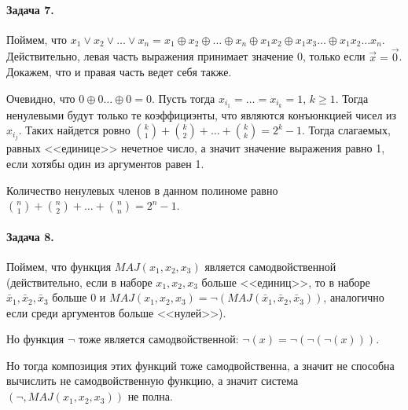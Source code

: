 \documentclass{article}
\newcommand{\xor}{\oplus}
\begin{document}
     \paragraph{Задача 7.}
     Поймем, что $x_1 \vee x_2 \vee \ldots \vee x_n = x_1 \xor x_2 \xor \ldots \xor x_n \xor x_1x_2 \xor x_1x_3 \ldots \xor x_1x_2\ldots x_n$. Действительно, левая часть выражения принимает значение 0, только если $\vec{x} = \vec{0}$.
     Докажем, что и правая часть ведет себя также.

     Очевидно, что $0 \xor 0 \ldots \xor 0 = 0$. Пусть тогда $x_{i_1}=  \ldots = x_{i_k} = 1$, $k \ge 1$. Тогда ненулевыми будут только те коэффициэнты, что являются конъюнкцией чисел из ${x_{i_j}}$. Таких найдется ровно ${k \choose 1} + {k \choose 2} + \ldots + {k \choose k} = 2^k - 1$. Тогда слагаемых, равных <<единице>> нечетное число, а значит значение выражения равно 1, если хотябы один из аргументов равен 1.

     Количество ненулевых членов в данном полиноме равно ${n \choose 1} + {n \choose 2} + \ldots + {n \choose n} = 2^n - 1$.
     
     \paragraph{Задача 8.}
     Поймем, что функция $MAJ(x_1, x_2, x_3)$ является самодвойственной (действительно, если в наборе $x_1, x_2, x_3$  больше <<единиц>>, то в наборе $\bar{x}_1, \bar{x}_2, \bar{x}_3$ больше 0 и $MAJ(x_1, x_2, x_3) = \neg(MAJ(\bar{x}_1, \bar{x}_2, \bar{x}_3))$, аналогично если среди аргументов больше <<нулей>>).

     Но функция $\neg$ тоже является самодвойственной: $\neg(x) = \neg(\neg(\neg(x)))$.

     Но тогда композиция этих функций тоже самодвойственна, а значит не способна вычислить не самодвойственную функцию, а значит система $(\neg, MAJ(x_1, x_2, x_3))$ не полна. 
\end{document}
